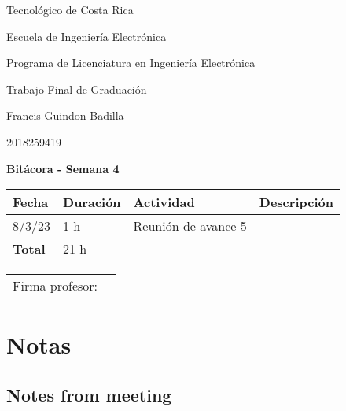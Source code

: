 \documentclass[12pt,oneside]{book}
\begin{document}
 \graphicspath{{./}{../tesis/fig/}}
  Tecnológico de Costa Rica
  \par\vspace{1mm}
  Escuela de Ingeniería Electrónica
  \par\vspace{1mm}
  Programa de Licenciatura en Ingeniería Electrónica
  \par\vspace{10mm}
  Trabajo Final de Graduación
  \par\vspace{1mm}
  Francis Guindon Badilla
  \par\vspace{1mm}
  2018259419
  \par\vspace{10mm}
  \large\textbf{Bitácora - Semana 4}
  \par\vspace{10mm}
  \small

  \begin{table} [!h]
    \centering
    \small
    \begin{tabular}{p{1.5 cm} p{2.1 cm} p{5 cm} p{8 cm}}
      \hline
      Fecha & Duración & Actividad & Descripción \\
      \hline
      8/3/23 & 1 h & Reunión de avance 5 & \\
      \hline
      \textbf{Total} & 21 h \\
      \hline
    \end{tabular}
  \end{table}
  
  \vfill

  \begin{tabular}{p{3 cm} p{10 cm}}
    Firma profesor: & \\
    \cline{2-2}
  \end{tabular}

  \newpage

  \section{Notas}
  \setlength\parindent{0pt}

  \subsection{Notes from meeting}
\end{document}
